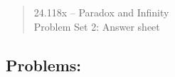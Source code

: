 \documentclass[12pt,a4paper]{article}
\begin{document}
\begin{quote}

\begin{center} {\large 24.118x -- Paradox and Infinity \\ \vspace{1mm}}
 {\large Problem Set 2: Answer sheet \\ \vspace{1mm}}
 
\end{center}
\vspace{3mm}



\end{quote} 

\subsection*{Problems:}
\end{document}
